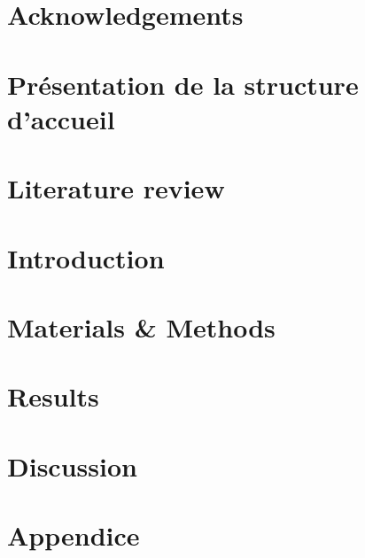 \documentclass[a4paper, 12pt, hidelinks]{article}
\begin{document}


\newpage
\tableofcontents
\newpage


\section{Acknowledgements}
\section{Présentation de la structure d'accueil}
\newpage
\section{Literature review}



\section{Introduction}


\section{Materials \& Methods}

\section{Results}

\section{Discussion}


\appendix
\section{Appendice}









\end{document}
